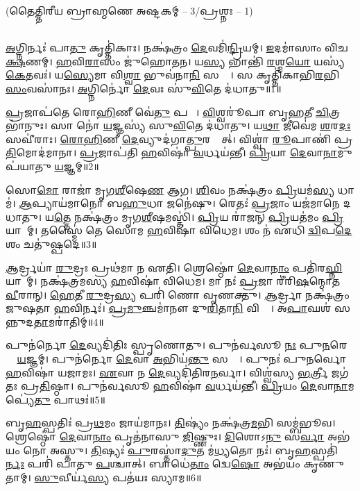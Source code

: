 
\vspace{-1ex}
\centerline{\normalsize(𑌤𑍈𑌤𑍍𑌤𑌿𑌰𑍀𑌯 𑌬𑍍𑌰𑌾𑌹𑍍𑌮𑌣𑍇 𑌅𑌷𑍍𑌟𑌕𑌮𑍍 -- 3/𑌪𑍍𑌰𑌶𑍍𑌨𑌃 -- 1)}\mbox{}\\[-2em]

\ul{𑌅}𑌗𑍍𑌨𑌿𑌰𑍍𑌨𑌃॑ 𑌪𑌾\ul{𑌤𑍁} 𑌕𑍃𑌤𑍍𑌤𑌿॑𑌕𑌾𑌃।
𑌨𑌕𑍍𑌷॑𑌤𑍍𑌰𑌂 \ul{𑌦𑍇}𑌵𑌮𑌿॑\ul{𑌨𑍍𑌦𑍍𑌰𑌿}𑌯𑌮𑍍।
\ul{𑌇}𑌦𑌮𑌾॑𑌸𑌾𑌂 𑌵𑌿𑌚\ul{𑌕𑍍𑌷}𑌣𑌮𑍍।
\ul{𑌹}𑌵𑌿\ul{𑌰𑌾}𑌸𑌂 𑌜𑍁॑𑌹𑍋𑌤𑌨।
𑌯\ul{𑌸𑍍𑌯} 𑌭𑌾𑌨𑍍𑌤𑌿॑ \ul{𑌰}𑌶𑍍𑌮\ul{𑌯𑍋} 𑌯𑌸𑍍𑌯॑ \ul{𑌕𑍇}𑌤𑌵𑌃॑।
𑌯\ul{𑌸𑍍𑌯𑍇}𑌮𑌾 𑌵𑌿\ul{𑌶𑍍𑌵𑌾} 𑌭𑍁𑌵॑𑌨𑌾\ul{𑌨𑌿} 𑌸𑌰𑍍𑌵𑌾᳚।
𑌸 𑌕𑍃𑌤𑍍𑌤𑌿॑𑌕𑌾𑌭𑌿\-\ul{𑌰}𑌭𑌿\ul{𑌸𑌂}𑌵𑌸𑌾॑𑌨𑌃।
\ul{𑌅}𑌗𑍍𑌨𑌿𑌰𑍍𑌨𑍋॑ \ul{𑌦𑍇}𑌵𑌃 𑌸𑍁॑\ul{𑌵𑌿}𑌤𑍇 𑌦॑𑌧𑌾𑌤𑍁॥1॥ 

\ul{𑌪𑍍𑌰}𑌜𑌾𑌪॑𑌤𑍇 𑌰𑍋\ul{𑌹𑌿}𑌣𑍀 𑌵𑍇॑\ul{𑌤𑍁} 𑌪𑌤𑍍𑌨𑍀᳚।
\ul{𑌵𑌿}𑌶𑍍𑌵𑌰𑍂॑𑌪𑌾 𑌬𑍃\ul{𑌹}𑌤𑍀 \ul{𑌚𑌿}𑌤𑍍𑌰𑌭𑌾॑𑌨𑍁𑌃।
𑌸𑌾 𑌨𑍋॑ \ul{𑌯}𑌜𑍍𑌞𑌸𑍍𑌯॑ 𑌸𑍁\ul{𑌵𑌿}𑌤𑍇 𑌦॑𑌧𑌾𑌤𑍁।
𑌯\ul{𑌥𑌾} 𑌜𑍀𑌵𑍇॑𑌮 \ul{𑌶}𑌰\ul{𑌦𑌃} 𑌸𑌵𑍀॑𑌰𑌾𑌃।
\ul{𑌰𑍋}\ul{𑌹𑌿}𑌣𑍀 \ul{𑌦𑍇}𑌵𑍍𑌯𑍁𑌦॑𑌗𑌾\ul{𑌤𑍍𑌪𑍁}𑌰𑌸𑍍𑌤𑌾᳚𑌤𑍍।
𑌵𑌿𑌶𑍍𑌵𑌾॑ \ul{𑌰𑍂}𑌪𑌾𑌣𑌿॑ 𑌪𑍍𑌰\ul{𑌤𑌿}𑌮𑍋𑌦॑𑌮𑌾𑌨𑌾।
\ul{𑌪𑍍𑌰}𑌜𑌾𑌪॑𑌤𑌿 \ul{𑌹}𑌵𑌿𑌷𑌾॑ \ul{𑌵}𑌰𑍍𑌧𑌯॑𑌨𑍍𑌤𑍀।
\ul{𑌪𑍍𑌰𑌿}𑌯𑌾 \ul{𑌦𑍇}𑌵𑌾\ul{𑌨𑌾}𑌮𑍁𑌪॑𑌯𑌾𑌤𑍁 \ul{𑌯}𑌜𑍍𑌞𑌮𑍍॥2॥ 

𑌸𑍋\ul{𑌮𑍋} 𑌰𑌾𑌜𑌾॑ 𑌮𑍃𑌗\ul{𑌶𑍀}\ar{}𑌷𑍇\ul{𑌣} 𑌆𑌗\sn{}।
\ul{𑌶𑌿}𑌵𑌂 𑌨𑌕𑍍𑌷॑𑌤𑍍𑌰𑌂 \ul{𑌪𑍍𑌰𑌿}𑌯𑌮॑\ul{𑌸𑍍𑌯} 𑌧𑌾𑌮॑।
\ul{𑌆}𑌪𑍍𑌯𑌾𑌯॑𑌮𑌾𑌨𑍋 𑌬\ul{𑌹𑍁}𑌧𑌾 𑌜𑌨𑍇॑𑌷𑍁।
𑌰𑍇𑌤𑌃॑ \ul{𑌪𑍍𑌰}𑌜𑌾𑌂 𑌯𑌜॑𑌮𑌾𑌨𑍇 𑌦𑌧𑌾𑌤𑍁।
𑌯\ul{𑌤𑍍𑌤𑍇} 𑌨𑌕𑍍𑌷॑𑌤𑍍𑌰𑌂 𑌮𑍃𑌗\ul{𑌶𑍀}\ar{}𑌷𑌮𑌸𑍍𑌤𑌿॑।
\ul{𑌪𑍍𑌰𑌿}𑌯 𑌰𑌾॑𑌜𑌨𑍍 \ul{𑌪𑍍𑌰𑌿}𑌯𑌤॑𑌮𑌂 \ul{𑌪𑍍𑌰𑌿}𑌯𑌾𑌣𑌾᳚𑌮𑍍।
𑌤𑌸𑍍𑌮𑍈॑ 𑌤𑍇 𑌸𑍋𑌮 \ul{𑌹}𑌵𑌿𑌷𑌾॑ 𑌵𑌿𑌧𑍇𑌮।
𑌶𑌂 𑌨॑ 𑌏𑌧𑌿 \ul{𑌦𑍍𑌵𑌿}𑌪\ul{𑌦𑍇} 𑌶𑌂 𑌚𑌤𑍁॑𑌷𑍍𑌪𑌦𑍇॥3॥ 

\ul{𑌆}𑌰𑍍𑌦𑍍𑌰𑌯𑌾॑ \ul{𑌰𑍁}𑌦𑍍𑌰𑌃 𑌪𑍍𑌰𑌥॑𑌮𑌾 𑌨 𑌏𑌤𑌿।
𑌶𑍍𑌰𑍇𑌷𑍍𑌠𑍋॑ \ul{𑌦𑍇}𑌵𑌾\ul{𑌨𑌾𑌂} 𑌪𑌤𑌿॑𑌰\ul{𑌘𑍍𑌨𑌿}𑌯𑌾𑌨𑌾᳚𑌮𑍍।
𑌨𑌕𑍍𑌷॑𑌤𑍍𑌰𑌮𑌸𑍍𑌯 \ul{𑌹}𑌵𑌿𑌷𑌾॑ 𑌵𑌿𑌧𑍇𑌮।
𑌮𑌾 𑌨𑌃॑ \ul{𑌪𑍍𑌰}𑌜𑌾 𑌰𑍀॑𑌰𑌿\ul{𑌷}𑌨𑍍𑌮𑍋𑌤 \ul{𑌵𑍀}𑌰𑌾𑌨𑍍।
\ul{𑌹𑍇}𑌤𑍀 \ul{𑌰𑍁}𑌦𑍍𑌰\ul{𑌸𑍍𑌯} 𑌪𑌰𑌿॑ 𑌣𑍋 𑌵𑍃𑌣𑌕𑍍𑌤𑍁।
\ul{𑌆}𑌰𑍍𑌦𑍍𑌰𑌾 𑌨𑌕𑍍𑌷॑𑌤𑍍𑌰𑌂 𑌜𑍁𑌷𑌤𑌾 \ul{𑌹}𑌵𑌿𑌰𑍍𑌨𑌃॑।
\ul{𑌪𑍍𑌰}\ul{𑌮𑍁}𑌞𑍍𑌚𑌮𑌾॑𑌨𑍗 𑌦𑍁\ul{𑌰𑌿}𑌤𑌾\ul{𑌨𑌿} 𑌵𑌿𑌶𑍍𑌵𑌾᳚।
𑌅\ul{𑌪𑌾}𑌘𑌶॑ 𑌸𑌨𑍍𑌨𑍁𑌦\ul{𑌤𑌾}𑌮𑌰𑌾॑𑌤𑌿𑌮𑍍॥4॥ 

𑌪𑍁𑌨॑𑌰𑍍𑌨𑍋 \ul{𑌦𑍇}𑌵𑍍𑌯𑌦𑌿॑𑌤𑌿𑌃 𑌸𑍍𑌪𑍃𑌣𑍋𑌤𑍁।
𑌪𑍁𑌨॑𑌰𑍍𑌵𑌸𑍂 \ul{𑌨𑌃} 𑌪𑍁\ul{𑌨}𑌰𑍇𑌤𑌾𑌂᳚ \ul{𑌯}𑌜𑍍𑌞𑌮𑍍।
𑌪𑍁𑌨॑𑌰𑍍𑌨𑍋 \ul{𑌦𑍇}𑌵𑌾 \ul{𑌅}𑌭𑌿𑌯॑\ul{𑌨𑍍𑌤𑍁} 𑌸𑌰𑍍𑌵𑍇᳚।
𑌪𑍁𑌨𑌃॑ 𑌪𑍁𑌨𑌰𑍍𑌵𑍋 \ul{𑌹}𑌵𑌿𑌷𑌾॑ 𑌯𑌜𑌾𑌮𑌃।
\ul{𑌏}𑌵𑌾 𑌨 \ul{𑌦𑍇}𑌵𑍍𑌯𑌦𑌿॑𑌤𑌿𑌰\ul{𑌨}𑌰𑍍𑌵𑌾।
𑌵𑌿𑌶𑍍𑌵॑𑌸𑍍𑌯 \ul{𑌭}𑌰𑍍𑌤𑍍𑌰𑍀 𑌜𑌗॑𑌤𑌃 𑌪𑍍𑌰\ul{𑌤𑌿}𑌷𑍍𑌠𑌾।
𑌪𑍁𑌨॑𑌰𑍍𑌵𑌸𑍂 \ul{𑌹}𑌵𑌿𑌷𑌾॑ \ul{𑌵}𑌰𑍍𑌧𑌯॑𑌨𑍍𑌤𑍀।
\ul{𑌪𑍍𑌰𑌿}𑌯𑌂 \ul{𑌦𑍇}𑌵𑌾\ul{𑌨𑌾}𑌮𑌪𑍍𑌯𑍇॑\ul{𑌤𑍁} 𑌪𑌾𑌥𑌃॑॥5॥ 

𑌬𑍃\ul{𑌹}𑌸𑍍𑌪𑌤𑌿𑌃॑ 𑌪𑍍𑌰\ul{𑌥}𑌮𑌂 𑌜𑌾𑌯॑𑌮𑌾𑌨𑌃।
\ul{𑌤𑌿}𑌷𑍍𑌯𑌂॑ 𑌨𑌕𑍍𑌷॑𑌤𑍍𑌰\ul{𑌮}𑌭𑌿 𑌸𑌮𑍍𑌬॑𑌭𑍂𑌵।
𑌶𑍍𑌰𑍇𑌷𑍍𑌠𑍋॑ \ul{𑌦𑍇}𑌵𑌾\ul{𑌨𑌾𑌂} 𑌪𑍃𑌤॑𑌨𑌾𑌸𑍁 \ul{𑌜𑌿}𑌷𑍍𑌣𑍁𑌃।
\ul{𑌦𑌿}𑌶𑍋𑌽\ul{𑌨𑍁} 𑌸\ul{𑌰𑍍𑌵𑌾} 𑌅𑌭॑𑌯𑌂 𑌨𑍋 𑌅𑌸𑍍𑌤𑍁।
\ul{𑌤𑌿}𑌷𑍍𑌯𑌃॑ \ul{𑌪𑍁}𑌰𑌸𑍍𑌤𑌾॑\ul{𑌦𑍁}𑌤 𑌮॑\ul{𑌧𑍍𑌯}𑌤𑍋 𑌨𑌃॑।
𑌬𑍃\ul{𑌹}𑌸𑍍𑌪𑌤𑌿॑\ul{𑌰𑍍𑌨𑌃} 𑌪𑌰𑌿॑ 𑌪𑌾𑌤𑍁 \ul{𑌪}𑌶𑍍𑌚𑌾𑌤𑍍।
𑌬𑌾𑌧𑍇॑\ul{𑌤𑌾𑌂} 𑌦𑍍𑌵𑍇\ul{𑌷𑍋} 𑌅𑌭॑𑌯𑌂 𑌕𑍃𑌣𑍁𑌤𑌾𑌮𑍍।
\ul{𑌸𑍁}𑌵𑍀𑌰𑍍𑌯॑\ul{𑌸𑍍𑌯} 𑌪𑌤॑𑌯𑌃 𑌸𑍍𑌯𑌾𑌮॥6॥ 


